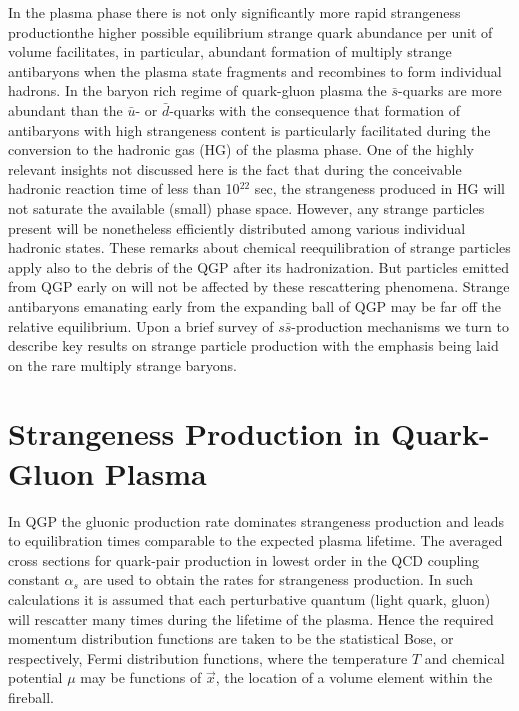 \begin{mdframed}[linecolor=gray,roundcorner=12pt,backgroundcolor=Dandelion!15,linewidth=1pt,leftmargin=0cm,rightmargin=0cm,topline=true,bottomline=true,skipabove=12pt]
In the plasma phase there is not only significantly more rapid strangeness production\footnotemark[1]  the higher possible equilibrium strange quark abundance per unit of volume facilitates, in particular, abundant formation of multiply strange antibaryons when the plasma state fragments and recombines to form individual hadrons. In the baryon rich regime of quark-gluon plasma the $\bar s$-quarks are more abundant than the $\bar u$- or $\bar d$-quarks with the consequence that formation of antibaryons with high strangeness content is particularly facilitated during the conversion to the hadronic gas (HG) of the plasma phase\footnotemark[2]. One of the highly relevant insights not discussed here is the fact that during the conceivable hadronic reaction time of less than 10$^{22}$ sec, the strangeness produced in HG will not saturate the available (small) phase space. However, any strange particles present will be nonetheless efficiently distributed among various individual hadronic states. These remarks about chemical reequilibration of strange particles apply also to the debris of the QGP after its hadronization. But particles emitted from QGP early on will not be affected by these rescattering phenomena. Strange antibaryons emanating early from the expanding ball of QGP may be far off the relative equilibrium. Upon a brief survey of $s \bar s$-production mechanisms we turn to describe key results on strange particle production with the emphasis being laid on the rare multiply strange baryons.

\section*{Strangeness Production in Quark-Gluon Plasma}
In QGP the gluonic production rate dominates strangeness production and leads to equilibration times comparable to the expected plasma lifetime\footnotemark[3]. The averaged cross sections for quark-pair production in lowest order in the QCD coupling constant $\alpha_s$ are used to obtain the rates for strangeness production. In such calculations it is assumed that each perturbative quantum (light quark, gluon) will rescatter many times during the lifetime of the plasma. Hence the required momentum distribution functions are taken to be the statistical Bose, or respectively, Fermi distribution functions, where the temperature $T$ and chemical potential $\mu$ may be functions of $\vec x$, the location of a volume element within the fireball.


\end{mdframed}
